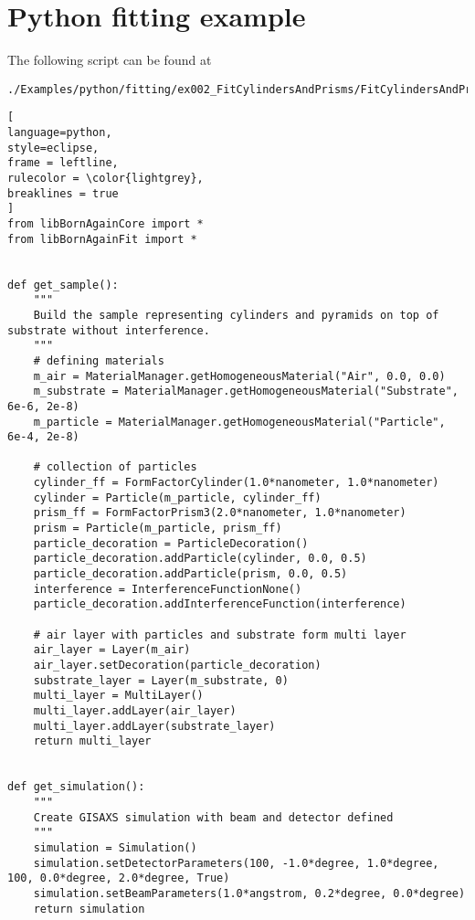 %
\newpage
\section{Python fitting example} \label{PythonFittingExampleScript}

The following script can be found at
\begin{lstlisting}[language=shell, style=commandline]
./Examples/python/fitting/ex002_FitCylindersAndPrisms/FitCylindersAndPrisms.py
\end{lstlisting}

\begin{lstlisting}[
language=python, 
style=eclipse, 
frame = leftline, 
rulecolor = \color{lightgrey},
breaklines = true
]
from libBornAgainCore import *
from libBornAgainFit import *


def get_sample():
    """
    Build the sample representing cylinders and pyramids on top of substrate without interference.
    """
    # defining materials
    m_air = MaterialManager.getHomogeneousMaterial("Air", 0.0, 0.0)
    m_substrate = MaterialManager.getHomogeneousMaterial("Substrate", 6e-6, 2e-8)
    m_particle = MaterialManager.getHomogeneousMaterial("Particle", 6e-4, 2e-8)

    # collection of particles
    cylinder_ff = FormFactorCylinder(1.0*nanometer, 1.0*nanometer)
    cylinder = Particle(m_particle, cylinder_ff)
    prism_ff = FormFactorPrism3(2.0*nanometer, 1.0*nanometer)
    prism = Particle(m_particle, prism_ff)
    particle_decoration = ParticleDecoration()
    particle_decoration.addParticle(cylinder, 0.0, 0.5)
    particle_decoration.addParticle(prism, 0.0, 0.5)
    interference = InterferenceFunctionNone()
    particle_decoration.addInterferenceFunction(interference)

    # air layer with particles and substrate form multi layer
    air_layer = Layer(m_air)
    air_layer.setDecoration(particle_decoration)
    substrate_layer = Layer(m_substrate, 0)
    multi_layer = MultiLayer()
    multi_layer.addLayer(air_layer)
    multi_layer.addLayer(substrate_layer)
    return multi_layer


def get_simulation():
    """
    Create GISAXS simulation with beam and detector defined
    """
    simulation = Simulation()
    simulation.setDetectorParameters(100, -1.0*degree, 1.0*degree, 100, 0.0*degree, 2.0*degree, True)
    simulation.setBeamParameters(1.0*angstrom, 0.2*degree, 0.0*degree)
    return simulation



\end{lstlisting}
